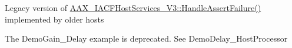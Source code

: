\begin{DoxyRefList}
\item[Member \mbox{\hyperlink{a01997_a49111de18abd12b671ae16138e244af3}{AAX\+\_\+\+IACFHost\+Services\+::Assert}} (const char $\ast$i\+File, int32\+\_\+t i\+Line, const char $\ast$i\+Note)=0]\label{a00803__deprecated000014}%
%
Legacy version of \mbox{\hyperlink{a02005_aaaddbd89dd3d6dd2e9e9def5b99c579f}{AAX\+\_\+\+IACFHost\+Services\+\_\+\+V3\+::\+Handle\+Assert\+Failure()}} implemented by older hosts 
\item[Module \mbox{\hyperlink{a00864}{Example\+Plug\+Ins}} ]\label{a00803__deprecated000001}%
%
The Demo\+Gain\+\_\+\+Delay example is deprecated. See Demo\+Delay\+\_\+\+Host\+Processor
\end{DoxyRefList}
